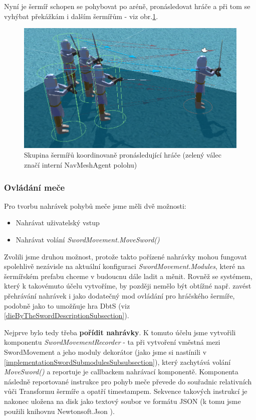 Nyní je šermíř schopen se pohybovat po aréně, pronásledovat hráče a při tom se vyhýbat překážkám i dalším šermířům - viz obr.\ref{obr05:demogameAiNavigation}.

\begin{figure}[h!]\centering
  \center
  \includegraphics[width=120mm]{../img/demogameAiNavigation.png}
  \caption{Skupina šermířů koordinovaně pronásledující hráče (zelený válec značí interní NavMeshAgent polohu)}
  \label{obr05:demogameAiNavigation}
\end{figure} 


\subsubsection*{Ovládání meče}

Pro tvorbu nahrávek pohybů meče jsme měli dvě možnosti:
\begin{itemize}
  \item Nahrávat uživatelský vstup
  \item Nahrávat volání \textit{SwordMovement.MoveSword()}
\end{itemize}

Zvolili jsme druhou možnost, protože takto pořízené nahrávky mohou fungovat spolehlivě nezávisle na aktuální konfiguraci \textit{SwordMovement.Modules}, které na šermířském prefabu chceme v budoucnu dále ladit a měnit. Rovněž se systémem, který k takovémuto účelu vytvoříme, by později nemělo být obtížné např. zavést přehrávání nahrávek i jako dodatečný mod ovládání pro hráčského šermíře, podobně jako to umožňuje hra \acl{DbtS} (viz \ref{dieByTheSwordDescriptionSubsection}).

\bigbreak

Nejprve bylo tedy třeba \textbf{pořídit nahrávky}. K tomuto účelu jsme vytvořili komponentu \textit{SwordMovementRecorder} - ta při vytvoření vměstná mezi SwordMovement a jeho moduly dekorátor (jako jsme si nastínili v \ref{implementationSwordSubmodulesSubsubsection}), který zachytává volání \textit{MoveSword()} a reportuje je callbackem nahrávací komponentě. Komponenta následně reportované instrukce pro pohyb meče převede do souřadnic relativních vůči Transformu šermíře a opatří timestampem. Sekvence takových instrukcí je nakonec uložena na disk jako textový soubor ve formátu JSON (k tomu jsme použili knihovnu Newtonsoft.Json \cite{NewtonsoftJson}).

